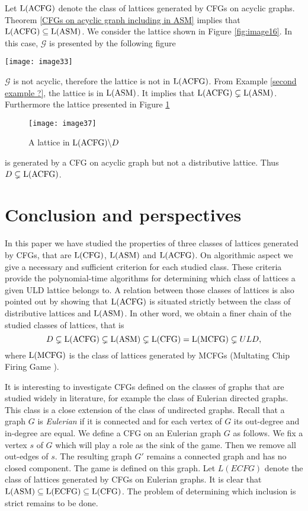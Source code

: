 \documentclass{article}
\theoremstyle{definition}
\begin{document}
Let ${\rm L(ACFG)}$ denote the class of lattices generated by CFGs on acyclic graphs. Theorem \ref{CFGs on acyclic graph including in ASM} implies that ${\rm L(ACFG)}\subseteq {\rm L(ASM)}$. We consider the lattice shown in Figure \ref{fig:image16}. In this case, $\mathcal{G}$ is presented by the following figure
\begin{center}
\texttt{[image: image33]}
\end{center}
$\mathcal{G}$ is not acyclic, therefore the lattice is not in ${\rm L(ACFG)}$. From Example \ref{second example ?}, the lattice is in ${\rm L(ASM)}$. It implies that ${\rm L(ACFG)}\subsetneq {\rm L(ASM)}$. Furthermore the lattice presented in Figure \ref{fig:image37}
\begin{figure}[h]
\centering
\texttt{[image: image37]}
\caption{A lattice in ${\rm L(ACFG)}\backslash D$}
\label{fig:image37}
\end{figure}
is generated by a CFG on acyclic graph but not a distributive lattice. Thus $D \subsetneq {\rm L(ACFG)}$.
\section{Conclusion and perspectives}
\label{sixth section}
In this paper we have studied the properties of three classes of lattices generated by CFGs, that are ${\rm L(CFG)}$, ${\rm L(ASM)}$ and ${\rm L(ACFG)}$. On algorithmic aspect we give a necessary and sufficient criterion for each studied class. These criteria provide the polynomial-time algorithms for determining which class of lattices a given ULD lattice belongs to. A relation between those classes of lattices is also pointed out by showing that ${\rm L(ACFG)}$ is situated strictly between the class of distributive lattices and ${\rm L(ASM)}$. In other word, we obtain a finer chain of the studied classes of lattices, that is
$$
D \subsetneq {\rm L(ACFG)} \subsetneq {\rm L(ASM)}\subsetneq {\rm L(CFG)}={\rm L(MCFG)}\subsetneq  ULD,
$$
where ${\rm L(MCFG)}$ is the class of lattices generated by MCFGs (Multating Chip Firing Game \cite{B97,H99,Mag03}).

It is interesting to investigate CFGs defined on the classes  of graphs that are studied widely in literature, for example the class of Eulerian directed graphs. This class is a close extension of the class of undirected graphs. Recall that a graph $G$ is \emph{Eulerian} if it is connected and for each vertex of $G$ its out-degree and in-degree are equal. We define a CFG on an Eulerian graph $G$ as follows. We fix a vertex $s$ of $G$ which will play a role as the sink of the game. Then we remove all out-edges of $s$. The resulting graph $G'$ remains a connected graph and has no closed component. The game is defined on this graph. Let $L(ECFG)$ denote the class of lattices generated by CFGs on Eulerian graphs. It is clear that ${\rm L(ASM)}\subseteq {\rm L(ECFG)}\subseteq {\rm L(CFG)}$. The problem of determining which inclusion is strict remains to be done.  
\end{document}
